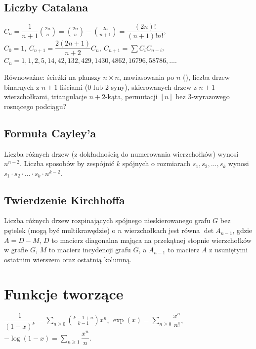 	\subsection{Liczby Catalana}
		$ C_n=\dfrac{1}{n+1}\binom{2n}{n}= \binom{2n}{n}-\binom{2n}{n+1} = \dfrac{(2n)!}{(n+1)!n!} $,
		$ C_0=1,\ C_{n+1} = \dfrac{2(2n+1)}{n+2}C_n,\ C_{n+1}=\sum C_iC_{n-i} $,
		$C_n = 1, 1, 2, 5, 14, 42, 132, 429, 1430, 4862, 16796, 58786, \dots$.

		Równoważne:
			ścieżki na planszy $n\times n$,
			nawiasowania po $n$ (),
			liczba drzew binarnych z $n+1$ liściami (0 lub 2 syny),
			skierowanych drzew z $n+1$ wierzchołkami,
			triangulacje $n+2$-kąta,
			permutacji $[n]$ bez 3-wyrazowego rosnącego podciągu?

	\subsection{Formuła Cayley'a}
		Liczba różnych drzew (z dokładnością do numerowania wierzchołków) wynosi $n^{n-2}$.
		Liczba sposobów by zespójnić $k$ spójnych o rozmiarach $s_1, s_2, \dots, s_k$ wynosi $s_1 \cdot s_2 \cdot \dots \cdot s_k \cdot n^{k-2}$.

	\subsection{Twierdzenie Kirchhoffa}
		Liczba różnych drzew rozpinających spójnego nieskierowanego grafu $G$ bez pętelek (mogą być multikrawędzie) o $n$ wierzchołkach jest równa $\det A_{n-1}$, gdzie $A = D - M$, $D$ to macierz diagonalna mająca na przekątnej stopnie wierzchołków w grafie $G$, $M$ to macierz incydencji grafu $G$, a $A_{n-1}$ to macierz $A$ z usuniętymi ostatnim wierszem oraz ostatnią kolumną.

\section{Funkcje tworzące}
		$ \dfrac{1}{\left(1-x\right)^k} = \sum_{n\geq 0} \binom{k - 1 + n}{k - 1} x ^ n $,
		$ \exp(x) = \sum_{n\geq 0} \dfrac{x^n}{n!} $,
		$ -\log(1 - x) = \sum_{n\geq 1} \dfrac{x^n}{n} $.

